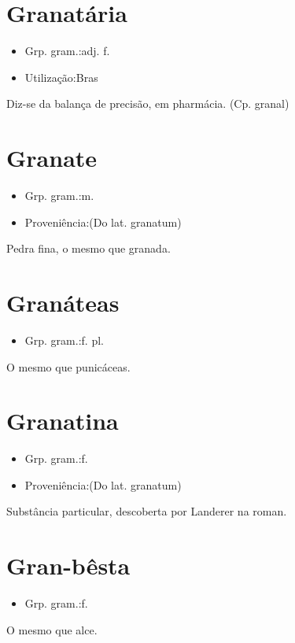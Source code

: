 \section{Granatária}
\begin{itemize}
\item {Grp. gram.:adj. f.}
\end{itemize}
\begin{itemize}
\item {Utilização:Bras}
\end{itemize}
Diz-se da balança de precisão, em pharmácia.
(Cp. \textunderscore granal\textunderscore )
\section{Granate}
\begin{itemize}
\item {Grp. gram.:m.}
\end{itemize}
\begin{itemize}
\item {Proveniência:(Do lat. \textunderscore granatum\textunderscore )}
\end{itemize}
Pedra fina, o mesmo que \textunderscore granada\textunderscore .
\section{Granáteas}
\begin{itemize}
\item {Grp. gram.:f. pl.}
\end{itemize}
O mesmo que \textunderscore punicáceas\textunderscore .
\section{Granatina}
\begin{itemize}
\item {Grp. gram.:f.}
\end{itemize}
\begin{itemize}
\item {Proveniência:(Do lat. \textunderscore granatum\textunderscore )}
\end{itemize}
Substância particular, descoberta por Landerer na roman.
\section{Gran-bêsta}
\begin{itemize}
\item {Grp. gram.:f.}
\end{itemize}
O mesmo que \textunderscore alce\textunderscore .
